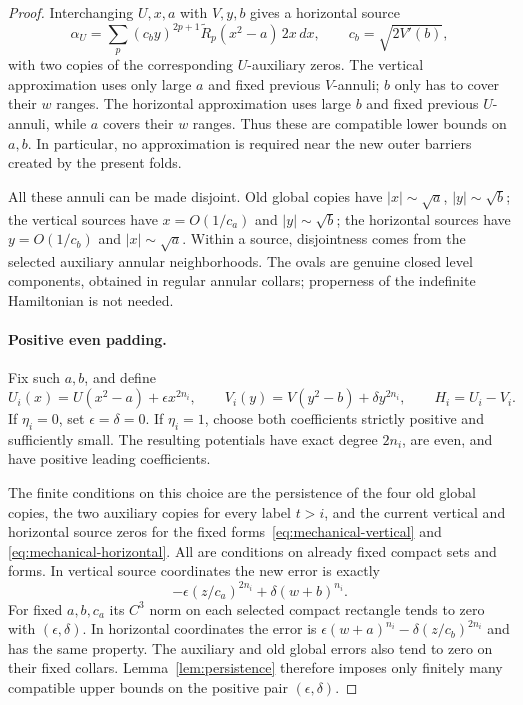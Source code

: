 \begin{proof}
Interchanging $U,x,a$ with $V,y,b$ gives a horizontal source
\begin{equation}\label{eq:mechanical-horizontal}
 \alpha_U=
 \sum_p(c_b y)^{2p+1}\widetilde R_p(x^2-a)\,2x\,dx,
 \qquad c_b=\sqrt{2V'(b)},
\end{equation}
with two copies of the corresponding $U$-auxiliary zeros.
The vertical approximation uses only large $a$ and fixed previous
$V$-annuli; $b$ only has to cover their $w$ ranges.  The horizontal
approximation uses large $b$ and fixed previous $U$-annuli, while $a$
covers their $w$ ranges.  Thus these are compatible lower bounds on
$a,b$.  In particular, no approximation is required near the new outer
barriers created by the present folds.

All these annuli can be made disjoint.  Old global copies have
$|x|\sim\sqrt a$, $|y|\sim\sqrt b$; the vertical sources have
$x=O(1/c_a)$ and $|y|\sim\sqrt b$; the horizontal sources have
$y=O(1/c_b)$ and $|x|\sim\sqrt a$.  Within a source, disjointness
comes from the selected auxiliary annular neighborhoods.  The ovals
are genuine closed level components, obtained in regular annular
collars; properness of the indefinite Hamiltonian is not needed.

\paragraph{Positive even padding.}
Fix such $a,b$, and define
\begin{equation}\label{eq:mechanical-padded-potentials}
 U_i(x)=U(x^2-a)+\epsilon x^{2n_i},\qquad
 V_i(y)=V(y^2-b)+\delta y^{2n_i},\qquad H_i=U_i-V_i.
\end{equation}
If $\eta_i=0$, set $\epsilon=\delta=0$.  If $\eta_i=1$, choose both
coefficients strictly positive and sufficiently small.  The resulting
potentials have exact degree $2n_i$, are even, and have positive leading
coefficients.

The finite conditions on this choice are the persistence of the four
old global copies, the two auxiliary copies for every label $t>i$,
and the current vertical and horizontal source zeros for the fixed
forms~\eqref{eq:mechanical-vertical} and
\eqref{eq:mechanical-horizontal}.  All are conditions on already fixed
compact sets and forms.  In vertical source coordinates the new error
is exactly
\[
 -\epsilon(z/c_a)^{2n_i}+\delta(w+b)^{n_i}.
\]
For fixed $a,b,c_a$ its $C^3$ norm on each selected compact rectangle
tends to zero with $(\epsilon,\delta)$.  In horizontal coordinates the
error is $\epsilon(w+a)^{n_i}-\delta(z/c_b)^{2n_i}$ and has the same
property.  The auxiliary and old global errors also tend to zero on
their fixed collars.  Lemma~\ref{lem:persistence} therefore imposes
only finitely many compatible upper bounds on the positive pair
$(\epsilon,\delta)$.


\end{proof}
